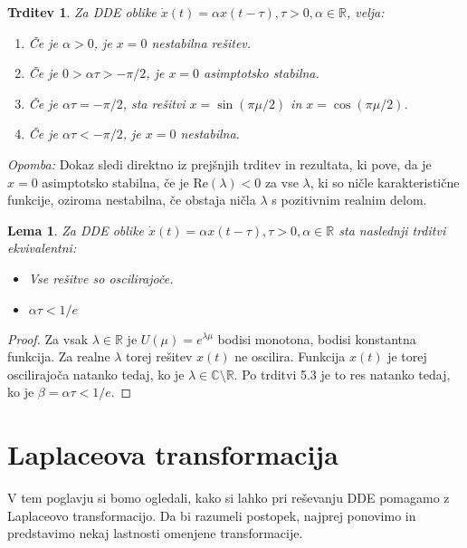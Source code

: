 \documentclass[12pt,a4paper]{amsart}
\theoremstyle{definition} %
\theoremstyle{plain} %
\newtheorem{lema}[definicija]{Lema}
\newtheorem{trditev}[definicija]{Trditev}
\newcommand{\R}{\mathbb R}
\begin{document}
\begin{trditev}
    Za DDE oblike $\dot{x}(t)= \alpha x(t-\tau), \tau >0, \alpha \in \R$, velja:
    \begin{enumerate}
        \item Če je $\alpha > 0$, je $x=0$ nestabilna rešitev.
        \item Če je $0>\alpha \tau >-\pi/2$, je $x=0$ asimptotsko stabilna.
        \item Če je $\alpha \tau = -\pi/2$, sta rešitvi $x=\sin(\pi\mu/2)$ in $x=\cos(\pi\mu/2)$.
        \item Če je $\alpha\tau < -\pi/2$, je $x=0$ nestabilna.
    \end{enumerate}
\end{trditev}

\noindent \textit{Opomba: }Dokaz sledi direktno iz prejšnjih trditev in rezultata, ki pove, da je $x=0$ asimptotsko stabilna, če 
je $\text{Re}(\lambda) < 0$ za vse $\lambda$, ki so ničle karakteristične funkcije, oziroma nestabilna,
če obstaja ničla $\lambda$ s pozitivnim realnim delom.

\begin{lema}
    Za DDE oblike $\dot{x}(t)= \alpha x(t-\tau), \tau >0, \alpha \in \R$ sta naslednji trditvi
    ekvivalentni:
    \begin{itemize}
        \item Vse rešitve so oscilirajoče.
        \item $\alpha\tau < 1/e$
    \end{itemize}
\end{lema}

\begin{proof}
    Za vsak $\lambda \in \R$ je $U(\mu)=e^{\lambda\mu}$ bodisi monotona, bodisi konstantna funkcija.
    Za realne $\lambda$ torej rešitev $x(t)$ ne oscilira. Funkcija $x(t)$ je torej oscilirajoča natanko tedaj, ko
    je $\lambda\in\mathbb{C}\setminus\mathbb{R}$. Po trditvi 5.3 je to res natanko tedaj, ko je 
    $\beta = \alpha\tau < 1/e$.
\end{proof}

\section{Laplaceova transformacija}

V tem poglavju si bomo ogledali, kako si lahko pri reševanju DDE pomagamo z Laplaceovo transformacijo.
Da bi razumeli postopek, najprej ponovimo in predstavimo nekaj lastnosti omenjene transformacije.
\end{document}
